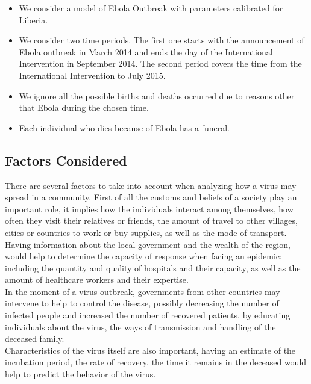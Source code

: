 \begin{itemize}
\item We consider a model of Ebola Outbreak with parameters calibrated for Liberia.
\item We consider two time periods. The first one starts with the announcement of Ebola outbreak in March 2014 and ends the day of the International Intervention in September 2014. The second period covers the time from the International Intervention to July 2015.
\item We ignore all the possible births and deaths occurred due to reasons other that Ebola during the chosen time. 
\item Each individual who dies because of Ebola has a funeral.
\end{itemize}


\subsection{Factors Considered}
There are several factors to take into account when analyzing how a virus may spread in a community. First of all the customs and beliefs of a society play an important role, it implies how the individuals interact among themselves, how often they visit their relatives or friends, the amount of travel to other villages, cities or countries to work or buy supplies, as well as the mode of transport.\\
Having information about the local government and the wealth of the region, would help to determine the capacity of response when facing an epidemic; including the quantity and quality of hospitals and their capacity, as well as the amount of healthcare workers and their expertise.\\
In the moment of a virus outbreak, governments from other countries may intervene to help to control the disease, possibly decreasing the number of infected people and increased the number of recovered patients, by educating individuals about the virus, the ways of transmission and handling of the deceased family. \\
Characteristics of the virus itself are also important, having an estimate of the incubation period, the rate of recovery, the time it remains in the deceased would help to predict the behavior of the virus.\\


